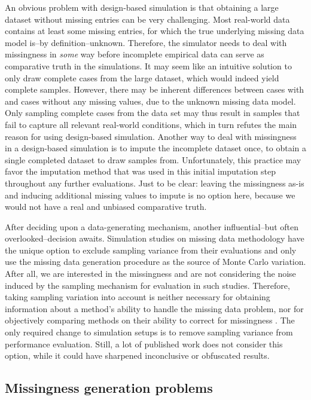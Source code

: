 \documentclass[bimj,fleqn]{w-art}
\begin{document}
An obvious problem with design-based simulation is that obtaining a large dataset without missing entries can be very challenging. Most real-world data contains at least some missing entries, for which the true underlying missing data model is--by definition--unknown. Therefore, the simulator needs to deal with missingness in \textit{some} way before incomplete empirical data can serve as comparative truth in the simulations. It may seem like an intuitive solution to only draw complete cases from the large dataset, which would indeed yield complete samples. However, there may be inherent differences between cases with and cases without any missing values, due to the unknown missing data model. Only sampling complete cases from the data set may thus result in samples that fail to capture all relevant real-world conditions, which in turn refutes the main reason for using design-based simulation. Another way to deal with missingness in a design-based simulation is to impute the incomplete dataset once, to obtain a single completed dataset to draw samples from. Unfortunately, this practice may favor the imputation method that was used in this initial imputation step throughout any further evaluations. Just to be clear: leaving the missingness as-is and inducing additional missing values to impute is no option here, because we would not have a real and unbiased comparative truth.

After deciding upon a data-generating mechanism, another influential--but often overlooked--decision awaits. Simulation studies on missing data methodology have the unique option to exclude sampling variance from their evaluations and only use the missing data generation procedure as the source of Monte Carlo variation. After all, we are interested in the missingness and are not considering the noise induced by the sampling mechanism for evaluation in such studies. Therefore, taking sampling variation into account is neither necessary for obtaining information about a method's ability to handle the missing data problem, nor for objectively comparing methods on their ability to correct for missingness \citep[see for a detailed discussion][]{vink14}. The only required change to simulation setups is to remove sampling variance from performance evaluation. Still, a lot of published work does not consider this option, while it could have sharpened inconclusive or obfuscated results.  



\subsection{Missingness generation problems}
\end{document}

